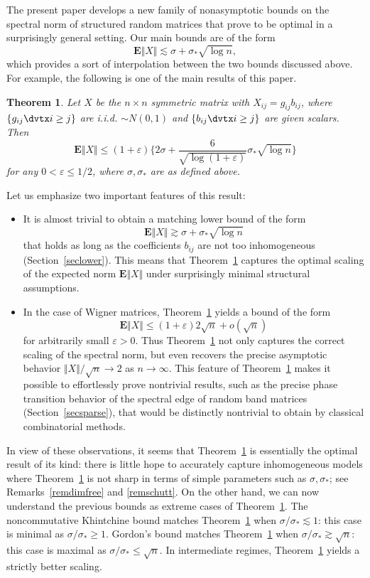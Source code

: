 \documentclass[aop,MSNbibl,dvips]{arximspdf}
\newcommand{\rrVert}{\Vert}
\newcommand{\llVert}{\Vert}
\newtheorem{teo}{Theorem}[section]
\newcommand{\EE}{\mathbf{E}}
\begin{document}
The present paper develops a new family of nonasymptotic bounds on the
spectral norm of structured random matrices that prove to be optimal in a
surprisingly general setting. Our main bounds are of the form
%
\[
\EE\llVert X\rrVert\lesssim\sigma+ \sigma_*\sqrt{\log n}, %
\]
%
which provides a sort of interpolation between the two bounds discussed
above. For example, the following is one of the main results of this
paper.

%
\begin{teo}
\label{teomain}
Let $X$ be the $n\times n$ symmetric matrix with
$X_{ij}=g_{ij}b_{ij}$, where $\{g_{ij}\dvtx i\ge j\}$ are i.i.d. $\sim N(0,1)$
and $\{b_{ij}\dvtx i\ge j\}$ are given scalars. Then
%
\[
\EE\llVert X\rrVert\le(1+\varepsilon)\biggl\{2\sigma+ \frac{6}{\sqrt
{\log(1+\varepsilon)}}
\sigma_*\sqrt{\log n}\biggr\} %
\]
%
for any $0<\varepsilon\le1/2$, where $\sigma,\sigma_*$ are as defined
above.
\end{teo}

\noindent
Let us emphasize two important features of this result:
%
\begin{itemize}
%
\item It is almost trivial to obtain a matching lower bound of the form
%
\[
\EE\llVert X\rrVert\gtrsim\sigma+\sigma_*\sqrt{\log n} %
\]
%
that holds as long as the coefficients $b_{ij}$ are not too inhomogeneous
(Section~\ref{seclower}). This means that Theorem~\ref{teomain}
captures the optimal scaling of the expected norm $\EE\llVert
X\rrVert $ under
surprisingly minimal structural assumptions.
\end{itemize}

\begin{itemize}
%
\item In the case of Wigner matrices, Theorem~\ref{teomain} yields a
bound of the form
%
\[
\EE\llVert X\rrVert\le(1+\varepsilon)2\sqrt{n}+o(\sqrt{n}) %
\]
%
for arbitrarily small $\varepsilon>0$. Thus Theorem~\ref{teomain} not
only captures the correct scaling of the spectral norm, but even recovers
the precise asymptotic behavior $\llVert X\rrVert /\sqrt{n}\to2$ as
$n\to\infty$.
This feature of Theorem~\ref{teomain} makes it possible to effortlessly
prove nontrivial results, such as the precise phase transition behavior of
the spectral edge of random band matrices (Section~\ref{secsparse}), that
would be distinctly nontrivial to obtain by classical combinatorial
methods.
\end{itemize}
%
In view of these observations, it seems that Theorem~\ref{teomain} is
essentially the optimal result of its kind: there is little hope to
accurately capture inhomogeneous models where Theorem~\ref{teomain} is
not sharp in terms of simple parameters such as $\sigma,\sigma_*$; see
Remarks~\ref{remdimfree} and \ref{remschutt}. On the other hand,
we can now understand the previous bounds as extreme cases of
Theorem~\ref{teomain}. The noncommutative Khintchine bound matches
Theorem~\ref{teomain} when $\sigma/\sigma_*\lesssim1$: this case is
minimal as $\sigma/\sigma_*\ge1$. Gordon's bound matches
Theorem~\ref{teomain} when $\sigma/\sigma_*\gtrsim\sqrt{n}$: this
case is maximal as $\sigma/\sigma_*\le\sqrt{n}$. In intermediate
regimes, Theorem~\ref{teomain} yields a strictly better scaling.
\end{document}
